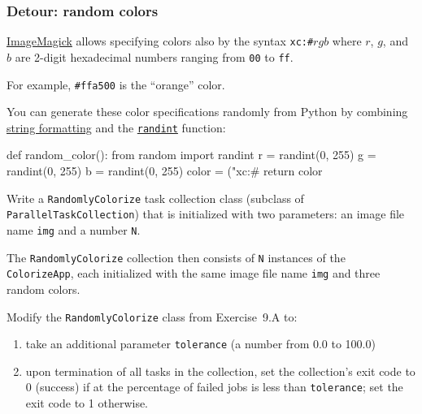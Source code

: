 \documentclass[english,serif,mathserif,xcolor=pdftex,dvipsnames,table]{beamer}
\begin{document}
\begin{frame}[fragile]
  \frametitle{Detour: random colors}

  \href{http://www.imagemagick.org/script/color.php}{ImageMagick}
  allows specifying colors also by the syntax \texttt{xc:\#}$rgb$ where
  $r$, $g$, and $b$ are 2-digit hexadecimal numbers ranging from
  \texttt{00} to \texttt{ff}.

  \+
  For example, \texttt{\#ffa500} is the ``orange'' color.

  \+ You can generate these color specifications randomly from Python
  by combining \href{https://pyformat.info/}{string formatting} and the
  \href{https://docs.python.org/2/library/random.html#random.randint}{\texttt{randint}}
  function:
\begin{python}
  def random_color():
    from random import randint
    r = randint(0, 255)
    g = randint(0, 255)
    b = randint(0, 255)
    color = ("xc:#%
    return color
\end{python}
\end{frame}


\begin{frame}
\begin{exercise*}[9.A]
  Write a \texttt{RandomlyColorize} task collection class (subclass of
  \texttt{ParallelTaskCollection}) that is initialized with two parameters: an
  image file name \texttt{img} and a number \texttt{N}.

  \+
  The \texttt{RandomlyColorize} collection then consists of
  \texttt{N} instances of the \texttt{ColorizeApp}, each initialized
  with the same image file name \texttt{img} and three random colors.
\end{exercise*}
\end{frame}


\begin{frame}
\begin{exercise*}[9.B]
  Modify the \texttt{RandomlyColorize} class from Exercise~9.A
  to:
  \begin{enumerate}
  \item take an additional parameter \texttt{tolerance} (a number from 0.0 to 100.0)
  \item upon termination of all tasks in the collection, set the collection's
    exit code to 0 (success) if at the percentage of failed jobs is less than
    \texttt{tolerance}; set the exit code to 1 otherwise.
  \end{enumerate}
\end{exercise*}
\end{frame}
\end{document}
